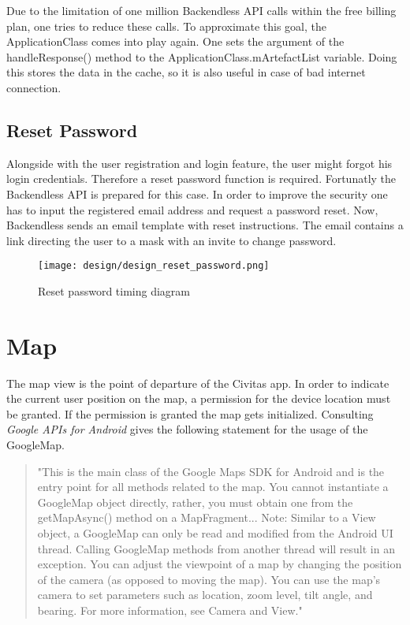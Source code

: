 Due to the limitation of one million Backendless API calls within the free billing plan, one tries to reduce these calls. To approximate this goal, the ApplicationClass comes into play again. One sets the argument of the handleResponse() method to the ApplicationClass.mArtefactList variable. Doing this stores the data in the cache, so it is also useful in case of bad internet connection.

\subsection{Reset Password}
Alongside with the user registration and login feature, the user might forgot his login credentials. Therefore a reset password function is required. Fortunatly the Backendless API is prepared for this case. In order to improve the security one has to input the registered email address and request a password reset. Now, Backendless sends an email template with reset instructions. The email contains a link directing the user to a mask with an invite to change password.

\begin{figure}[H]
	\centering \texttt{[image: design/design\_reset\_password.png]}
	\caption{Reset password timing diagram}	
	\label{fig:design_reset_password}
\end{figure} 



\section{Map}
The map view is the point of departure of the Civitas app. In order to indicate the current user position on the map, a permission for the device location must be granted. If the permission is granted the map gets initialized. Consulting \textit{Google APIs for Android} gives the following statement for the usage of the GoogleMap.

\begin{quote}
"This is the main class of the Google Maps SDK for Android and is the entry point for all methods related to the map. You cannot instantiate a GoogleMap object directly, rather, you must obtain one from the getMapAsync() method on a MapFragment... 
Note: Similar to a View object, a GoogleMap can only be read and modified from the Android UI thread. Calling GoogleMap methods from another thread will result in an exception. You can adjust the viewpoint of a map by changing the position of the camera (as opposed to moving the map). You can use the map's camera to set parameters such as location, zoom level, tilt angle, and bearing. For more information, see Camera and View." \cite{googleMap}
\end{quote}

